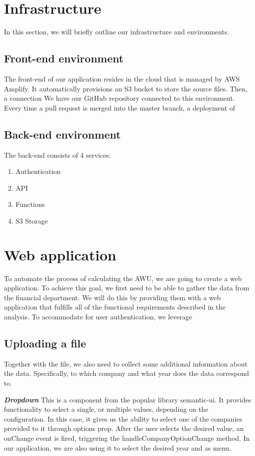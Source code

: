 \documentclass[12pt,oneside]{fithesis2}
\begin{document}
\section{Infrastructure}
In this section, we will briefly outline our infrastructure and environments.
\subsection*{Front-end environment}
The front-end of our application resides in the cloud that is managed by AWS Amplify. It automatically provisions an S3 bucket to store the source files. Then, a connection 
We have our GitHub repository connected to this environment. Every time a pull request is merged into the master branch, a deployment of 
\subsection*{Back-end environment}
The back-end consists of 4 services:
\begin{enumerate}
    \setlength\itemsep{0em}
    \item Authentication
    \item API
    \item Functions
    \item S3 Storage
\end{enumerate}
\section{Web application}
To automate the process of calculating the AWU, we are going to create a web application. To achieve this goal, we first need to be able to gather the data from the financial department. We will do this by providing them with a web application that fulfills all of the functional requirements described in the analysis.
To accommodate for user authentication, we leverage 

\subsection{Uploading a file}
Together with the file, we also need to collect some additional information about the data. Specifically, to which company and what year does the data correspond to.

\textit{\textbf{Dropdown}} This is a component from the popular library semantic-ui. It provides functionality to select a single, or multiple values, depending on the configuration. In this case, it gives us the ability to select one of the companies provided to it through options prop. After the user selects the desired value, an onChange event is fired, triggering the handleCompanyOptionChange method. In our application, we are also using it to select the desired year and as menu.
\end{document}
